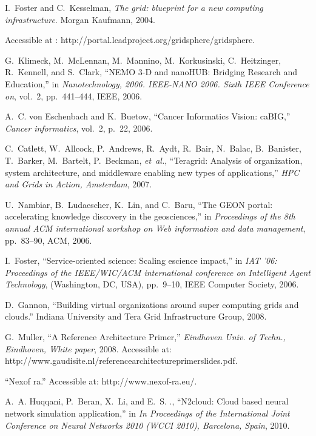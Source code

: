 \documentclass[]{article}
\begin{document}
\begin{thebibliography}{10}
I.~Foster and C.~Kesselman, {\em {The grid: blueprint for a new computing
  infrastructure}}.
\newblock Morgan Kaufmann, 2004.

Accessible at : http://portal.leadproject.org/gridsphere/gridsphere.

G.~Klimeck, M.~McLennan, M.~Mannino, M.~Korkusinski, C.~Heitzinger, R.~Kennell,
  and S.~Clark, ``{NEMO 3-D and nanoHUB: Bridging Research and Education},'' in
  {\em Nanotechnology, 2006. IEEE-NANO 2006. Sixth IEEE Conference on}, vol.~2,
  pp.~441--444, IEEE, 2006.

A.~C. von Eschenbach and K.~Buetow, ``{Cancer Informatics Vision: caBIG},''
  {\em Cancer informatics}, vol.~2, p.~22, 2006.

C.~Catlett, W.~Allcock, P.~Andrews, R.~Aydt, R.~Bair, N.~Balac, B.~Banister,
  T.~Barker, M.~Bartelt, P.~Beckman, {\em et~al.}, ``{Teragrid: Analysis of
  organization, system architecture, and middleware enabling new types of
  applications},'' {\em HPC and Grids in Action, Amsterdam}, 2007.

U.~Nambiar, B.~Ludaescher, K.~Lin, and C.~Baru, ``{The GEON portal:
  accelerating knowledge discovery in the geosciences},'' in {\em Proceedings
  of the 8th annual ACM international workshop on Web information and data
  management}, pp.~83--90, ACM, 2006.

I.~Foster, ``Service-oriented science: Scaling escience impact,'' in {\em IAT
  '06: Proceedings of the IEEE/WIC/ACM international conference on Intelligent
  Agent Technology}, (Washington, DC, USA), pp.~9--10, IEEE Computer Society,
  2006.

D.~Gannon, ``Building virtual organizations around super computing grids and
  clouds.'' Indiana University and Tera Grid Infrastructure Group, 2008.

G.~Muller, ``{A Reference Architecture Primer},'' {\em Eindhoven Univ. of
  Techn., Eindhoven, White paper}, 2008.
\newblock Accessible at:
  http://www.gaudisite.nl/referencearchitectureprimerslides.pdf.

``Nexof ra.'' Accessible at: http://www.nexof-ra.eu/.

A.~A. Huqqani, P.~Beran, X.~Li, and E.~S. ., ``N2cloud: Cloud based neural
  network simulation application,'' in {\em In Proceedings of the International
  Joint Conference on Neural Networks 2010 (WCCI 2010), Barcelona, Spain},
  2010.


\end{thebibliography}
\end{document}
